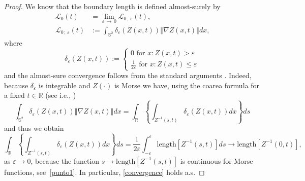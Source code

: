 \documentclass[AHL,Unicode,longabstracts,published]{cedram}
\newcommand{\clL}{\mathcal{L}}
\newcommand{\bbS}{\mathbb{S}}
\newcommand{\bbR}{\mathbb{R}}
\begin{document}
\begin{proof}
We know that the boundary length is defined almost-surely by
\begin{align*}
\clL_{0}(t) &\mathcal{=}\lim_{\varepsilon\,\rightarrow\,0}\clL _{0\,;\,\varepsilon }(t)\text{, } \\
\clL_{0\,;\,\varepsilon }(t) &:=\int_{\bbS^{2}}\delta _{\varepsilon }(Z(x,t))\left\Vert \nabla Z(x,t)\right\Vert dx\text{,}
\end{align*}
where
\begin{equation*}
\delta _{\varepsilon }(Z(x,t)):=\left\{
\begin{array}{c}
0\text{ for }x:Z(x,t)>\varepsilon \\
\frac{1}{2\varepsilon }\text{ for }x:Z(x,t)\leq \varepsilon
\end{array}
\right.
\end{equation*}
and the almost-sure convergence follows from the standard arguments \cite[Lem\-ma~3.1]{RW08}. Indeed, because $\delta _{\varepsilon }$ is integrable and $Z(\cdot)$ is Morse we have, using the coarea formula for a fixed $t\in
\bbR$ (see i.e., \cite[p.~169]{adlertaylor})
\begin{equation*}
\int_{\bbS^{2}}\delta_{\varepsilon }(Z(x,t))\left\Vert \nabla Z(x,t)\right\Vert dx=\int_{\bbR}\left\{ \int_{Z^{-1}(s,t)}\delta_{\varepsilon }(Z(x,t))dx\right\} ds
\end{equation*}
and thus we obtain
\begin{equation*}
\int_{\bbR}\left\{ \int_{Z^{-1}(s,t)}\delta_{\varepsilon }(Z(x,t))dx\right\} ds=\frac{1}{2\varepsilon }\int_{-\varepsilon }^{\varepsilon }\textrm{length}\left[Z^{-1}(s,t)\right] ds\rightarrow \textrm{length}\left[Z^{-1}(0,t)\right],
\end{equation*}
as $\varepsilon \rightarrow 0$, because the function $s\rightarrow \textrm{length}[Z^{-1}(s,t)] $ is continuous for Morse functions, see~\ref{punto1}. In particular, \eqref{convergence} holds a.s.


\end{proof}
\end{document}
